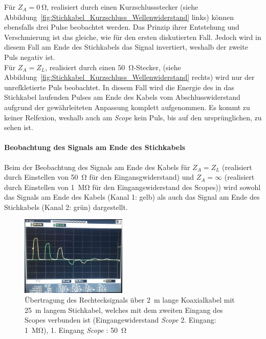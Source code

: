 \documentclass[a4paper,twoside,final]{article}
\begin{document}
Für $Z_A = \SI{0}{\ohm}$, realisiert durch einen Kurzschlussstecker (siehe Abbildung~\ref{fig:Stichkabel_Kurzschluss_Wellenwiderstand} links) können ebensfalls drei Pulse beobachtet werden. Das Prinzip ihrer Entstehung und \glqq Verschmierung\grqq{} ist das gleiche, wie für den ersten diskutierten Fall. Jedoch wird in diesem Fall am Ende des Stichkabels das Signal invertiert, weshalb der zweite Puls negativ ist. \\
Für $Z_A = Z_L$, realisiert durch einen \SI{50}{\ohm}-Stecker, (siehe Abbildung~\ref{fig:Stichkabel_Kurzschluss_Wellenwiderstand} rechts) wird nur der unrefkletierte Puls beobachtet. In diesem Fall wird die Energie des in das Stichkabel laufenden Pulses am Ende des Kabels vom Abschlusswiderstand aufgrund der gewährleiteten Anpassung komplett aufgenommen. Es kommt zu keiner Relfexion, weshalb auch am \textit{Scope} kein Puls, bis auf den ursprünglichen, zu sehen ist.

\paragraph{Beobachtung des Signals am Ende des Stichkabels }
Beim der Beobachtung des Signals am Ende des Kabels für $Z_A = Z_L$ (realisiert durch Einstellen von \SI{50}{\ohm} für den Eingansgwiderstand) und $Z_A = \infty$ (realisiert durch Einstellen von \SI{1}{\mega\ohm} für den Eingangswiderstand des Scopes)) wird sowohl das Signals am Ende des Kabels (Kanal 1: gelb) als auch das Signal am Ende des Stichkabels (Kanal 2: grün) dargestellt.\\

\begin{figure}[htp]
    \centering
        \includegraphics[width=0.45\textwidth]{Bilder/Bild7.jpg}
    \caption{Übertragung des Rechtecksignals über \SI{2}{\metre} lange Koaxialkabel mit \SI{25}{\metre} langem Stichkabel, welches mit dem zweiten Eingang des Scopes verbunden ist (Eingangewiderstand \textit{Scope} 2. Eingang: \SI{1}{\mega\ohm}), 1. Eingang \textit{Scope} : \SI{50}{\ohm}}
\end{figure}
\end{document}
